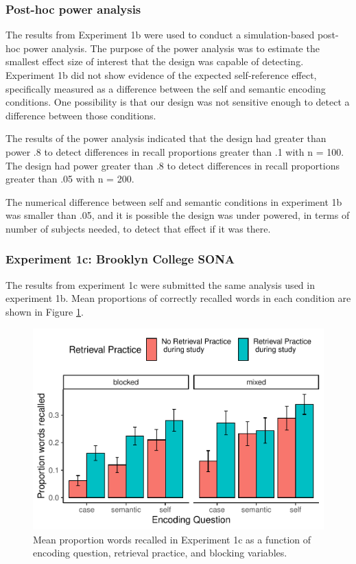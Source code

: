 \documentclass[
  man,floatsintext]{apa6}
\begin{document}
\hypertarget{post-hoc-power-analysis}{%
\subsubsection{Post-hoc power analysis}\label{post-hoc-power-analysis}}

The results from Experiment 1b were used to conduct a simulation-based post-hoc power analysis. The purpose of the power analysis was to estimate the smallest effect size of interest that the design was capable of detecting. Experiment 1b did not show evidence of the expected self-reference effect, specifically measured as a difference between the self and semantic encoding conditions. One possibility is that our design was not sensitive enough to detect a difference between those conditions.

The results of the power analysis indicated that the design had greater than power .8 to detect differences in recall proportions greater than .1 with n = 100. The design had power greater than .8 to detect differences in recall proportions greater than .05 with n = 200.

The numerical difference between self and semantic conditions in experiment 1b was smaller than .05, and it is possible the design was under powered, in terms of number of subjects needed, to detect that effect if it was there.

\hypertarget{experiment-1c-brooklyn-college-sona}{%
\subsubsection{Experiment 1c: Brooklyn College SONA}\label{experiment-1c-brooklyn-college-sona}}

The results from experiment 1c were submitted the same analysis used in experiment 1b. Mean proportions of correctly recalled words in each condition are shown in Figure \ref{fig:E1Cresults}.

\begin{figure}
\centering
\includegraphics{Thesis_files/figure-latex/E1Cresults-1.pdf}
\caption{\label{fig:E1Cresults}Mean proportion words recalled in Experiment 1c as a function of encoding question, retrieval practice, and blocking variables.}
\end{figure}
\end{document}
